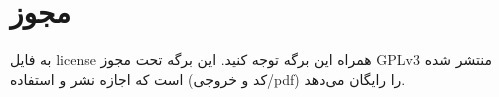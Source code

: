 \documentclass[a4paper]{article}
\begin{document}


\tableofcontents
\listoffigures
\listoftables

\section*{مجوز}

به فایل license همراه این برگه توجه کنید. این برگه تحت مجوز GPLv3 منتشر شده است
که اجازه نشر و استفاده (کد و خروجی/pdf) را رایگان می‌دهد.

\newpage




\newpage


\end{document}

